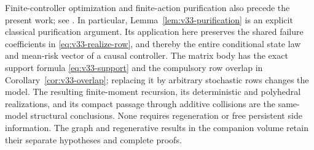 Finite-controller optimization and finite-action purification also
precede the present work; see \cite{V32Amato,DWW1951}. In particular,
Lemma~\ref{lem:v33-purification} is an explicit classical purification
argument. Its application here preserves the shared failure coefficients
in \eqref{eq:v33-realize-row}, and thereby the entire conditional
state law and mean-risk vector of a causal controller. The matrix body
has the exact support formula \eqref{eq:v33-support} and the compulsory
row overlap in Corollary~\ref{cor:v33-overlap}; replacing it by arbitrary
stochastic rows changes the model. The resulting finite-moment
recursion, its deterministic and polyhedral realizations, and its
compact passage through additive collisions are the same-model
structural conclusions. None requires regeneration or free persistent
side information. The graph and regenerative results in the companion
volume retain their separate hypotheses and complete proofs.
